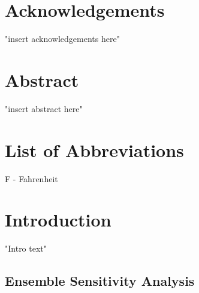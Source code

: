 \documentclass{ttuthes2014}
\newcommand{\tab}{\hspace*{2em}}  %
\begin{document}
\chapter{Acknowledgements}

\tab "insert acknowledgements here"


\tableofcontents

\chapter{Abstract}

\tab "insert abstract here"



\listoftables

\listoffigures

\chapter{List of Abbreviations}

F - Fahrenheit \\




\mainmatter
\chapter{Introduction}  %

"Intro text"

\section{Ensemble Sensitivity Analysis}  %
\end{document}
